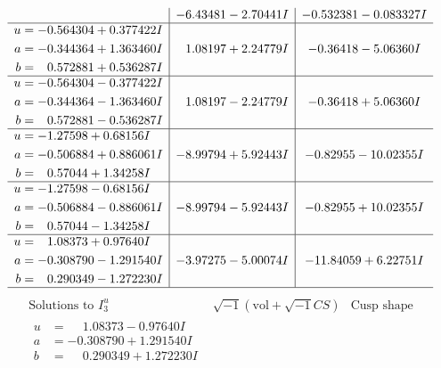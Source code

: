 \documentclass[1p]{elsarticle_modified}
\theoremstyle{definition}
\newcommand{\I}{\sqrt{-1}}
\begin{document}
$$\begin{array}{c|c|c}
 & -6.43481 - 2.70441 I & -0.532381 - 0.083327 I \\ \hline\begin{aligned}
u &= -0.564304 + 0.377422 I \\
a &= -0.344364 + 1.363460 I \\
b &= \phantom{-}0.572881 + 0.536287 I\end{aligned}
 & \phantom{-}1.08197 + 2.24779 I & -0.36418 - 5.06360 I \\ \hline\begin{aligned}
u &= -0.564304 - 0.377422 I \\
a &= -0.344364 - 1.363460 I \\
b &= \phantom{-}0.572881 - 0.536287 I\end{aligned}
 & \phantom{-}1.08197 - 2.24779 I & -0.36418 + 5.06360 I \\ \hline\begin{aligned}
u &= -1.27598 + 0.68156 I \\
a &= -0.506884 + 0.886061 I \\
b &= \phantom{-}0.57044 + 1.34258 I\end{aligned}
 & -8.99794 + 5.92443 I & -0.82955 - 10.02355 I \\ \hline\begin{aligned}
u &= -1.27598 - 0.68156 I \\
a &= -0.506884 - 0.886061 I \\
b &= \phantom{-}0.57044 - 1.34258 I\end{aligned}
 & -8.99794 - 5.92443 I & -0.82955 + 10.02355 I \\ \hline\begin{aligned}
u &= \phantom{-}1.08373 + 0.97640 I \\
a &= -0.308790 - 1.291540 I \\
b &= \phantom{-}0.290349 - 1.272230 I\end{aligned}
 & -3.97275 - 5.00074 I & -11.84059 + 6.22751 I\\
 \hline 
 \end{array}$$\newpage$$\begin{array}{c|c|c}  
\text{Solutions to }I^u_{3}& \I (\text{vol} + \sqrt{-1}CS) & \text{Cusp shape}\\
 \hline 
\begin{aligned}
u &= \phantom{-}1.08373 - 0.97640 I \\
a &= -0.308790 + 1.291540 I \\
b &= \phantom{-}0.290349 + 1.272230 I\end{aligned}

\end{array}$$
\end{document}
